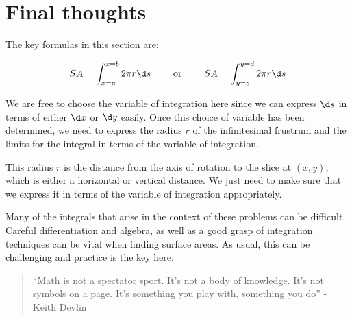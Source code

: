 \documentclass{ximera}
\begin{document}
%    
%    


\section{Final thoughts}
The key formulas in this section are:

\[
SA=\int_{x=a}^{x=b} 2 \pi r \d s \qquad \textrm{ or }  \qquad SA=\int_{y=c}^{y=d} 2 \pi r \d s
\]

We are free to choose the variable of integration here since we can express $\d s$ in terms of either $\d x$ or $\d y$ easily.  Once this choice of variable has been determined, we need to express the radius $r$ of the infinitesimal frustrum and the limits for the integral in terms of the variable of integration.  

This radius $r$ is the distance from the axis of rotation to the slice at $(x,y)$, which is either a horizontal or vertical distance.  We just need to make sure that we express it in terms of the variable of integration appropriately.

Many of the integrals that arise in the context of these problems can be difficult.  Careful differentiation and algebra, as well as a good grasp of integration techniques can be vital when finding surface areas.  As usual, this can be challenging and practice is the key here.

\begin{quote}
``Math is not a spectator sport.  It's not a body of knowledge.  It's not symbols on a page. It's something you play with, something you do'' - Keith Devlin
\end{quote}
\end{document}
